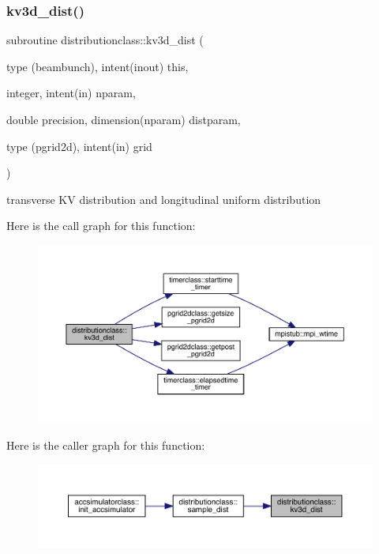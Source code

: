 \subsubsection{\texorpdfstring{kv3d\_dist()}{kv3d\_dist()}}
{\footnotesize\ttfamily subroutine distributionclass\+::kv3d\+\_\+dist (\begin{DoxyParamCaption}\item[{type (beambunch), intent(inout)}]{this,  }\item[{integer, intent(in)}]{nparam,  }\item[{double precision, dimension(nparam)}]{distparam,  }\item[{type (pgrid2d), intent(in)}]{grid }\end{DoxyParamCaption})}



transverse KV distribution and longitudinal uniform distribution 

Here is the call graph for this function\+:\nopagebreak
\begin{figure}[H]
\begin{center}
\leavevmode
\includegraphics[width=350pt]{namespacedistributionclass_a2e96d2c85cac39531d37f2ce057c5766_cgraph}
\end{center}
\end{figure}
Here is the caller graph for this function\+:\nopagebreak
\begin{figure}[H]
\begin{center}
\leavevmode
\includegraphics[width=350pt]{namespacedistributionclass_a2e96d2c85cac39531d37f2ce057c5766_icgraph}
\end{center}
\end{figure}
\mbox{\label{namespacedistributionclass_a635c045c52b04bd03c076b8b8454b278}} 
